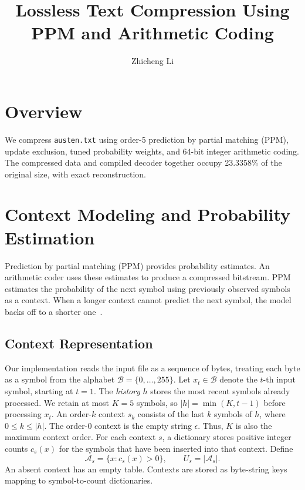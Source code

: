 \documentclass[12pt,onecolumn]{article}
\title{Lossless Text Compression Using PPM and Arithmetic Coding}
\author{Zhicheng Li}
\date{}
\newcommand{\byte}[1]{\texttt{#1}}
\begin{document}
\maketitle



\section{Overview}
We compress \byte{austen.txt} using order-5 prediction by partial matching
(PPM), update exclusion, tuned probability weights, and 64-bit integer
arithmetic coding. The compressed data and compiled decoder together occupy
23.3358\% of the original size, with exact reconstruction.

\section{Context Modeling and Probability Estimation}
\label{sec:model}

Prediction by partial matching (PPM) provides probability estimates.
An arithmetic coder uses these estimates to produce a compressed bitstream.
PPM estimates the probability of the next symbol using previously observed
symbols as a context. When a longer context cannot predict the next symbol,
the model backs off to a shorter one~\cite{cleary1984}.

\subsection{Context Representation}

Our implementation reads the input file as a sequence of bytes, treating each byte as a symbol from the alphabet $\mathcal{B}=\{0,\ldots,255\}$.
Let $x_t\in\mathcal{B}$ denote the $t$-th input symbol, starting at $t=1$.
The \emph{history} $h$ stores the most recent symbols already processed.
We retain at most $K=5$ symbols, so $|h|=\min(K,t-1)$ before processing $x_t$.
An order-$k$ context $s_k$ consists of the last $k$ symbols of $h$,
where $0\leq k\leq |h|$. The order-0 context is the empty string $\epsilon$.
Thus, $K$ is also the maximum context order.
For each context $s$, a dictionary stores
positive integer counts $c_s(x)$ for the symbols that have been inserted into that
context. Define
\begin{equation}
  \mathcal{A}_s=\{x:c_s(x)>0\}, \qquad U_s=|\mathcal{A}_s|.
\end{equation}
An absent context has an empty table. Contexts are stored as byte-string keys
mapping to symbol-to-count dictionaries.
\end{document}
